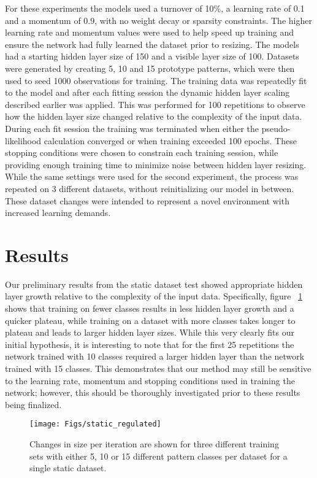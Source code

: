For these experiments the models used a turnover of 10\%, a learning rate 
of 0.1 and a momentum of 0.9, with no weight decay or 
sparsity constraints. 
The higher learning rate and momentum values were used to help 
speed up training and ensure the network had fully learned the 
dataset prior to resizing.
The models had a starting hidden 
layer size of 150 and a visible layer size of 100. 
Datasets were generated by creating 5, 10 and 15 prototype patterns, which 
were then used to seed 1000 observations for training. 
The training data was repeatedly fit to the model and after each fitting 
session the dynamic hidden layer scaling described earlier was applied. 
This was performed for 100 repetitions to observe how the hidden 
layer size changed relative to the complexity of the input data.
During each fit session the training was terminated when 
either the pseudo-likelihood calculation converged or when 
training exceeded 100 epochs. 
These stopping conditions 
were chosen to constrain each training session, while providing 
enough training time to minimize noise between hidden layer resizing. 
While the same settings were used for the second experiment, 
the process was repeated on 3 different datasets, without reinitializing our 
model in between. 
These dataset changes were intended 
to represent a novel environment with increased learning demands.

\section{Results}

Our preliminary results from the static dataset test showed 
appropriate hidden layer growth relative to the complexity of the input data. 
Specifically, figure ~\ref{fig:static_regulated} shows that 
training on fewer classes results in less hidden layer growth and a quicker plateau, 
while training on a dataset with more classes takes longer to plateau and 
leads to larger hidden layer sizes. 
While this very clearly fits our initial hypothesis, 
it is interesting to note that for the first 25 repetitions the network trained with 10 classes 
required a larger hidden layer than the network trained with 15 classes.
This demonstrates that our method may still be sensitive to the learning rate, 
momentum and stopping conditions used in training the network; 
however, this should be thoroughly investigated prior to these results being finalized.

\begin{figure}[!h]
\begin{center}
\texttt{[image: Figs/static\_regulated]}
\end{center}
\caption{
Changes in size per iteration are shown for three 
different training sets with either 5, 10 or 15 different pattern classes 
per dataset for a single static dataset.}
\label{fig:static_regulated}
\end{figure}

